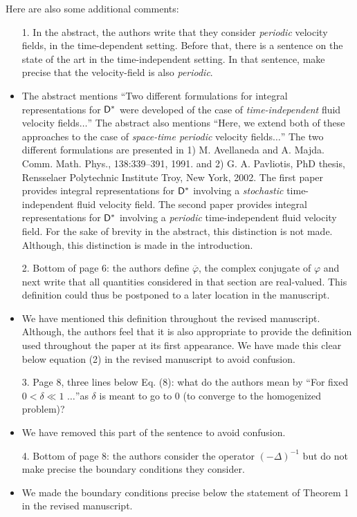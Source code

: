 \documentclass[amsa]{article}
\begin{document}
Here are also some additional comments:

\begin{itemize}
% 
\item[1.] In the abstract, the authors write that they consider
  \emph{periodic} velocity fields, in the time-dependent
  setting. Before that, there is a sentence on the state of the art in 
  the time-independent setting. In that sentence, make precise that
  the velocity-field is also \emph{periodic}. 
%  
\item The abstract mentions ``Two different formulations for integral
  representations for $\mathsf{D}^*$ were developed of the case of
  \emph{time-independent} fluid velocity fields$\ldots$'' The abstract also
  mentions ``Here, we extend both of these approaches to the case of
  \emph{space-time periodic} velocity fields$\ldots$'' The two different
  formulations are presented in 1) M. Avellaneda and
  A. Majda. Comm. Math. Phys., 138:339--391, 1991. and
  2) G. A. Pavliotis, PhD thesis, Rensselaer 
  Polytechnic Institute Troy, New York, 2002. The first paper provides 
  integral representations for $\mathsf{D}^*$ involving a \emph{stochastic}
  time-independent fluid velocity field. The second paper provides
  integral representations for $\mathsf{D}^*$ involving a \emph{periodic} 
  time-independent fluid velocity field. For the sake of brevity in
  the abstract, this distinction is not made. Although, this
  distinction is made in the introduction.
%
\item[2.] Bottom of page 6: the authors define $\overline{\varphi}$, the
  complex conjugate of $\varphi$ and next write that all quantities
  considered in that section are real-valued. This definition could
  thus be postponed to a later location in the manuscript.
%  
\item We have mentioned this definition throughout the revised
  manuscript. Although, the authors feel that it is also appropriate
  to provide the definition used throughout the paper at its first
  appearance. We have made this clear below equation (2) in the
  revised manuscript to avoid confusion.
%  
\item[3.] Page 8, three lines below Eq. (8): what do the authors mean
  by ``For fixed $0<\delta\ll1$ $\ldots$''as $\delta$ is meant to go to 0 (to converge
  to the homogenized problem)?
%
\item We have removed this part of the sentence to avoid confusion.
%
\item[4.] Bottom of page 8: the authors consider the operator
  $(-\Delta)^{-1}$ but do not make precise the boundary conditions they
  consider.
%  
\item We made the boundary conditions precise below the statement of
  Theorem 1 in the revised manuscript.
%  
\end{itemize}
\end{document}
